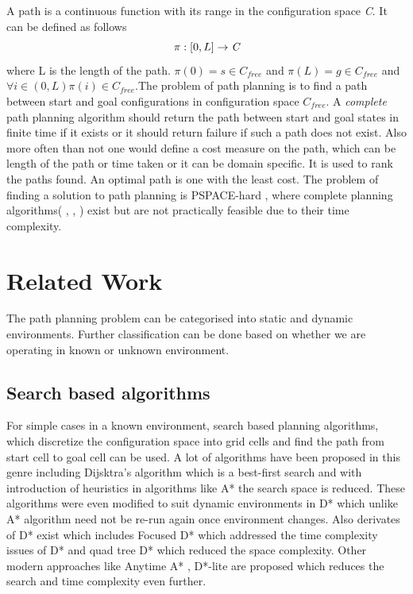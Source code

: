 \documentclass[MTech]{iitmdiss}
\begin{document}
A path is a continuous function with its range in the configuration space \emph{C}. It can be defined as follows $$\pi:[0,L] \rightarrow \emph{C}$$  where L is the length of the path. $\pi(0) = s \in C_{free}$ and $\pi(L) = g \in C_{free}$ and $\forall i \in (0,L) \pi(i) \in C_{free} $.The problem of path planning is to find a path between start and goal configurations in configuration space \emph{$C_{free}$}. 
A \emph{complete} path planning algorithm should return the path  between start and goal states in finite time if it exists or it should return failure if such a path does not exist. Also more often than not one would define a cost measure on the path, which can be length of the path or time taken or it can be domain specific. It is used to rank the  paths found. An optimal path is one with the least cost. The problem of finding a solution to path planning is PSPACE-hard \cite{reif79} , where complete planning algorithms( \cite{perez79}, \cite{schsha83},  \cite{canny88} ) exist but are not practically feasible due to their time complexity.  

\section{Related Work}
The path planning problem can be categorised into static and dynamic environments. Further classification can be done based on whether we are operating in known or unknown environment. 
\subsection{Search based algorithms}
For simple cases in a known environment, search based planning algorithms, which discretize the configuration space into grid cells and find the path from start cell to goal cell can be used. A lot of algorithms have been proposed in this genre including Dijsktra's algorithm \cite{d59} which is a best-first search and with introduction of heuristics in algorithms like A*\cite{hnb68} the search space is reduced. These algorithms were even modified to suit dynamic environments in D* \cite{stentz94} which unlike A* algorithm need not be re-run again once environment changes. Also derivates of D* exist which includes Focused D* \cite{stentz95} which addressed the time complexity issues of D*  and quad tree D* \cite{samet88} which reduced the space complexity. Other modern approaches like Anytime A* \cite{hr07}, D*-lite \cite{koeni02} are proposed which reduces the search and time complexity even further.
\end{document}
